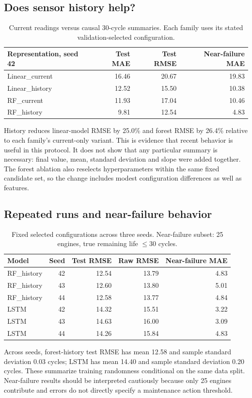 \documentclass[11pt]{article}
\begin{document}
\subsection{Does sensor history help?}
\begin{table}[H]\centering\small
\begin{tabular}{lrrr}\toprule
Representation, seed 42 & Test MAE & Test RMSE & Near-failure MAE \\\midrule
Linear\_current & 16.46 & 20.67 & 19.83 \\
Linear\_history & 12.52 & 15.50 & 10.38 \\
RF\_current & 11.93 & 17.04 & 10.46 \\
RF\_history & 9.81 & 12.54 & 4.83 \\
\bottomrule\end{tabular}
\caption{Current readings versus causal 30-cycle summaries. Each family uses its stated validation-selected configuration.}
\end{table}
History reduces linear-model RMSE by 25.0\% and forest RMSE by 26.4\% relative to each family's current-only variant. This is evidence that recent behavior is useful in this protocol. It does not show that any particular summary is necessary: final value, mean, standard deviation and slope were added together. The forest ablation also reselects hyperparameters within the same fixed candidate set, so the change includes modest configuration differences as well as features.
\subsection{Repeated runs and near-failure behavior}
\begin{table}[H]\centering\small
\begin{tabular}{lrrrr}\toprule
Model & Seed & Test RMSE & Raw RMSE & Near-failure MAE \\\midrule
RF\_history & 42 & 12.54 & 13.79 & 4.83 \\
RF\_history & 43 & 12.60 & 13.80 & 5.01 \\
RF\_history & 44 & 12.58 & 13.77 & 4.84 \\
LSTM & 42 & 14.32 & 15.51 & 3.22 \\
LSTM & 43 & 14.63 & 16.00 & 3.09 \\
LSTM & 44 & 14.26 & 15.84 & 4.83 \\
\bottomrule\end{tabular}
\caption{Fixed selected configurations across three seeds. Near-failure subset: 25 engines, true remaining life $\leq30$ cycles.}
\end{table}
Across seeds, forest-history test RMSE has mean 12.58 and sample standard deviation 0.03 cycles; LSTM has mean 14.40 and sample standard deviation 0.20 cycles. These summarize training randomness conditional on the same data split. Near-failure results should be interpreted cautiously because only 25 engines contribute and errors do not directly specify a maintenance action threshold.
\end{document}
